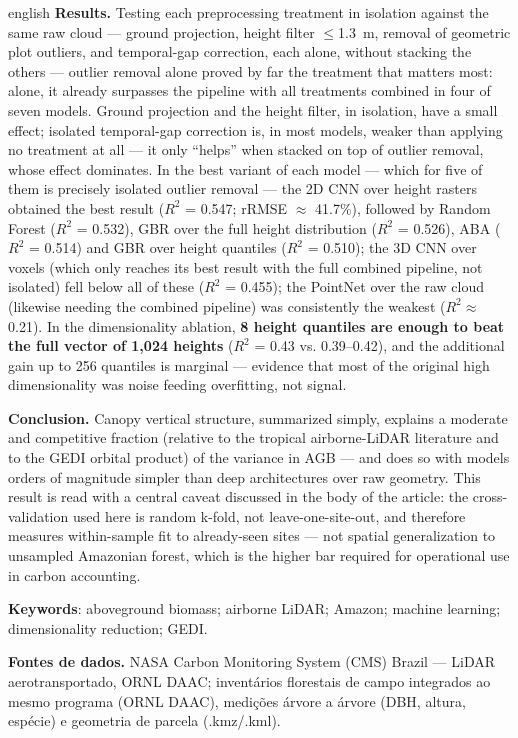 \documentclass[article,12pt,oneside,a4paper]{abntex2}
\begin{document}
\begin{resumoumacoluna}[Abstract]
\begin{otherlanguage*}{english}
\textbf{Results.} Testing each preprocessing treatment in isolation against
the same raw cloud --- ground projection, height filter $\leq$1.3~m, removal
of geometric plot outliers, and temporal-gap correction, each alone, without
stacking the others --- outlier removal alone proved by far the treatment
that matters most: alone, it already surpasses the pipeline with all
treatments combined in four of seven models. Ground projection and the height
filter, in isolation, have a small effect; isolated temporal-gap correction
is, in most models, weaker than applying no treatment at all --- it only
``helps'' when stacked on top of outlier removal, whose effect dominates. In
the best variant of each model --- which for five of them is precisely
isolated outlier removal --- the 2D CNN over height rasters obtained the best
result ($R^2$ = 0.547; rRMSE $\approx$ 41.7\%), followed by Random Forest
($R^2$ = 0.532), GBR over the full height distribution ($R^2$ = 0.526), ABA
($R^2$ = 0.514) and GBR over height quantiles ($R^2$ = 0.510); the 3D CNN over
voxels (which only reaches its best result with the full combined pipeline,
not isolated) fell below all of these ($R^2$ = 0.455); the PointNet over the
raw cloud (likewise needing the combined pipeline) was consistently the
weakest ($R^2 \approx$ 0.21). In the dimensionality ablation, \textbf{8 height
quantiles are enough to beat the full vector of 1,024 heights} ($R^2$ = 0.43
vs. 0.39--0.42), and the additional gain up to 256 quantiles is marginal ---
evidence that most of the original high dimensionality was noise feeding
overfitting, not signal.

\textbf{Conclusion.} Canopy vertical structure, summarized simply, explains a
moderate and competitive fraction (relative to the tropical airborne-LiDAR
literature and to the GEDI orbital product) of the variance in AGB --- and
does so with models orders of magnitude simpler than deep architectures over
raw geometry. This result is read with a central caveat discussed in the body
of the article: the cross-validation used here is random k-fold, not
leave-one-site-out, and therefore measures within-sample fit to already-seen
sites --- not spatial generalization to unsampled Amazonian forest, which is
the higher bar required for operational use in carbon accounting.

\vspace{\onelineskip}
\noindent\textbf{Keywords}: aboveground biomass; airborne LiDAR; Amazon;
machine learning; dimensionality reduction; GEDI.
\end{otherlanguage*}
\end{resumoumacoluna}








\vspace{1em}
\noindent\textbf{Fontes de dados.}
NASA Carbon Monitoring System (CMS) Brazil --- LiDAR aerotransportado, ORNL DAAC;
inventários florestais de campo integrados ao mesmo programa (ORNL DAAC), medições
árvore a árvore (DBH, altura, espécie) e geometria de parcela (.kmz/.kml).
\end{document}
